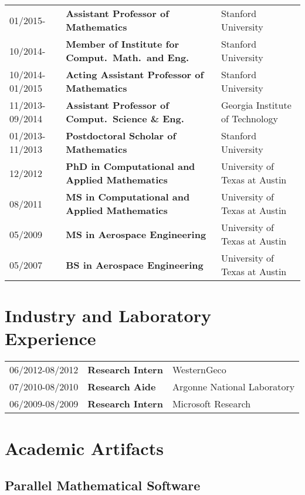\documentclass[letterpaper]{article}
\begin{document}
\begin{tabular}{lll}
01/2015-        & {\bf Assistant Professor of Mathematics}               & Stanford University \\
10/2014-        & {\bf Member of Institute for Comput.\ Math.\ and Eng.} & Stanford University \\
10/2014-01/2015 & {\bf Acting Assistant Professor of Mathematics}        & Stanford University \\
11/2013-09/2014 & {\bf Assistant Professor of Comput.\ Science \& Eng. } & Georgia Institute of Technology \\
01/2013-11/2013 & {\bf Postdoctoral Scholar of Mathematics}              & Stanford University \\
12/2012         & {\bf PhD in Computational and Applied Mathematics}     & University of Texas at Austin \\
08/2011         & {\bf MS in Computational and Applied Mathematics}      & University of Texas at Austin \\
05/2009         & {\bf MS in Aerospace Engineering}                      & University of Texas at Austin \\
05/2007         & {\bf BS in Aerospace Engineering}                      & University of Texas at Austin \\
\end{tabular}

\section*{Industry and Laboratory Experience}

\begin{tabular}{lll}
06/2012-08/2012 & {\bf Research Intern} & WesternGeco                 \\
07/2010-08/2010 & {\bf Research Aide}   & Argonne National Laboratory \\
06/2009-08/2009 & {\bf Research Intern} & Microsoft Research          \\
\end{tabular}

\section*{Academic Artifacts}

\subsection*{Parallel Mathematical Software}
\end{document}
